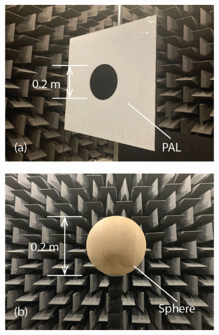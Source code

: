 \begin{figure}[!htb]
    \centering
    \begin{subfigure}{0.45\textwidth}
        \centering
        \includegraphics[width = \textwidth]{fig/PAL_resize.jpg}
    \end{subfigure}
    \begin{subfigure}{0.45\textwidth}
        \centering
        \includegraphics[width = \textwidth]{fig/sphere_resize.jpg}
    \end{subfigure}
    \\
    \begin{subfigure}{0.45\textwidth}
        \centering

\end{subfigure}
\end{figure}
